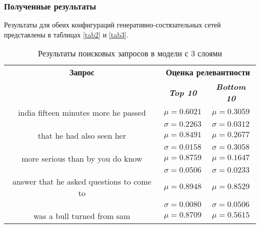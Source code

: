 \subsubsection{Полученные результаты}
Результаты для обеих конфигураций генеративно-состязательных сетей представлены в таблицах \ref{tab2} и \ref{tab3}.
\begin{table}[tbp]
    \caption{Результаты поисковых запросов в модели с 3 слоями}
    \begin{center}
        \begin{tabular}{ccc}
            \toprule
            \textbf{Запрос}                           & \multicolumn{2}{c}{\textbf{Оценка релевантности}}                               \\
                                                      & \textbf{\textit{Top 10}}                          & \textbf{\textit{Bottom 10}} \\
            \midrule
            india  fifteen minutes more he passed     & \(\mu=0.6021\)                                    & \(\mu=0.3059\)              \\
                                                      & \(\sigma=0.2263\)                                 & \(\sigma=0.0312\)           \\
            \midrule
            that he had also seen her                 & \(\mu=0.8491\)                                    & \(\mu=0.2677\)              \\
                                                      & \(\sigma=0.0158\)                                 & \(\sigma=0.3058\)           \\
            \midrule
            more serious than by you do know          & \(\mu=0.8759\)                                    & \(\mu=0.1647\)              \\
                                                      & \(\sigma=0.0506\)                                 & \(\sigma=0.0233\)           \\
            \midrule
            answer that he asked questions to come to & \(\mu=0.8948\)                                    & \(\mu=0.8529\)              \\
                                                      & \(\sigma=0.0080\)                                 & \(\sigma=0.0506\)           \\
            \midrule
            was a bull turned from sam                & \(\mu=0.8709\)                                    & \(\mu=0.5615\)              \\

\end{tabular}
\end{center}
\end{table}
